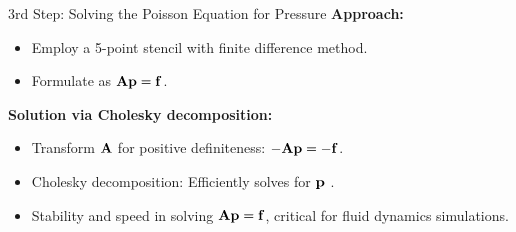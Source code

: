 

\begin{frame}{3rd Step: Solving the Poisson Equation for Pressure}
  \textbf{Approach:}
  \begin{itemize}
    \item {} Employ a 5-point stencil with finite difference method.
    \item {} Formulate as $\boldsymbol{\mathrm{A}}\boldsymbol{\mathrm{p}}=\boldsymbol{\mathrm{f}}$.
  \end{itemize}

  \textbf{Solution via Cholesky decomposition:}
  \begin{itemize}
    \item Transform \(\boldsymbol{\mathrm{A}}\) for positive definiteness: \(-\boldsymbol{\mathrm{A}}\boldsymbol{\mathrm{p}} = -\boldsymbol{\mathrm{f}}\).
    \item Cholesky decomposition: Efficiently solves for \(\boldsymbol{\mathrm{p}}\) .
    \item Stability and speed in solving \(\boldsymbol{\mathrm{A}}\boldsymbol{\mathrm{p}}=\boldsymbol{\mathrm{f}}\), critical for fluid dynamics simulations.
  \end{itemize}

\end{frame}





